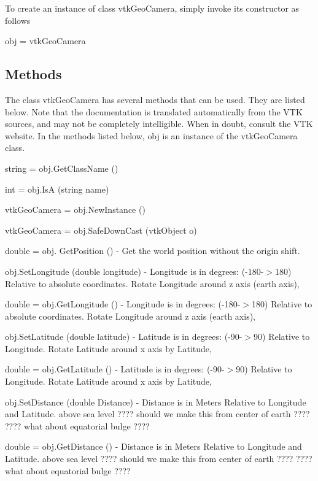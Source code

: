 To create an instance of class vtk\-Geo\-Camera, simply invoke its constructor as follows \begin{DoxyVerb}  obj = vtkGeoCamera
\end{DoxyVerb}
 \hypertarget{vtkwidgets_vtkxyplotwidget_Methods}{}\subsection{Methods}\label{vtkwidgets_vtkxyplotwidget_Methods}
The class vtk\-Geo\-Camera has several methods that can be used. They are listed below. Note that the documentation is translated automatically from the V\-T\-K sources, and may not be completely intelligible. When in doubt, consult the V\-T\-K website. In the methods listed below, {\ttfamily obj} is an instance of the vtk\-Geo\-Camera class. 
\begin{DoxyItemize}
\item {\ttfamily string = obj.\-Get\-Class\-Name ()}  
\item {\ttfamily int = obj.\-Is\-A (string name)}  
\item {\ttfamily vtk\-Geo\-Camera = obj.\-New\-Instance ()}  
\item {\ttfamily vtk\-Geo\-Camera = obj.\-Safe\-Down\-Cast (vtk\-Object o)}  
\item {\ttfamily double = obj. Get\-Position ()} -\/ Get the world position without the origin shift.  
\item {\ttfamily obj.\-Set\-Longitude (double longitude)} -\/ Longitude is in degrees\-: (-\/180-\/$>$180) Relative to absolute coordinates. Rotate Longitude around z axis (earth axis),  
\item {\ttfamily double = obj.\-Get\-Longitude ()} -\/ Longitude is in degrees\-: (-\/180-\/$>$180) Relative to absolute coordinates. Rotate Longitude around z axis (earth axis),  
\item {\ttfamily obj.\-Set\-Latitude (double latitude)} -\/ Latitude is in degrees\-: (-\/90-\/$>$90) Relative to Longitude. Rotate Latitude around x axis by Latitude,  
\item {\ttfamily double = obj.\-Get\-Latitude ()} -\/ Latitude is in degrees\-: (-\/90-\/$>$90) Relative to Longitude. Rotate Latitude around x axis by Latitude,  
\item {\ttfamily obj.\-Set\-Distance (double Distance)} -\/ Distance is in Meters Relative to Longitude and Latitude. above sea level ???? should we make this from center of earth ???? ???? what about equatorial bulge ????  
\item {\ttfamily double = obj.\-Get\-Distance ()} -\/ Distance is in Meters Relative to Longitude and Latitude. above sea level ???? should we make this from center of earth ???? ???? what about equatorial bulge ????  

\end{DoxyItemize}
